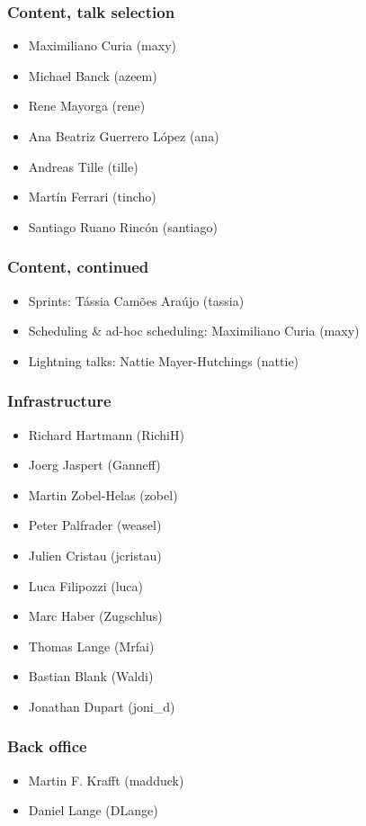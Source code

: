 \documentclass[t]{beamer}
\begin{document}
\begin{frame}
	\frametitle{Content, talk selection}
	\begin{itemize}
		\item Maximiliano Curia (maxy)
		\item Michael Banck (azeem)
		\item Rene Mayorga (rene)
		\item Ana Beatriz Guerrero López (ana)
		\item Andreas Tille (tille)
		\item Martín Ferrari (tincho)
		\item Santiago Ruano Rincón (santiago)
	\end{itemize}
\end{frame}

\begin{frame}
	\frametitle{Content, continued}
	\begin{itemize}
		\item Sprints: Tássia Camões Araújo (tassia)
		\item Scheduling \& ad-hoc scheduling: Maximiliano Curia (maxy)
		\item Lightning talks: Nattie Mayer-Hutchings (nattie)
	\end{itemize}
\end{frame}

\begin{frame}
	\frametitle{Infrastructure}
	\begin{itemize}
		\item Richard Hartmann (RichiH)
		\item Joerg Jaspert (Ganneff)
		\item Martin Zobel-Helas (zobel)
		\item Peter Palfrader (weasel)
		\item Julien Cristau (jcristau)
		\item Luca Filipozzi (luca)
		\item Marc Haber (Zugschlus)
		\item Thomas Lange (Mrfai)
		\item Bastian Blank (Waldi)
		\item Jonathan Dupart (joni\_d)
	\end{itemize}
\end{frame}

\begin{frame}
	\frametitle{Back office}
	\begin{itemize}
		\item Martin F. Krafft (madduck)
		\item Daniel Lange (DLange)
	\end{itemize}
\end{frame}
\end{document}
